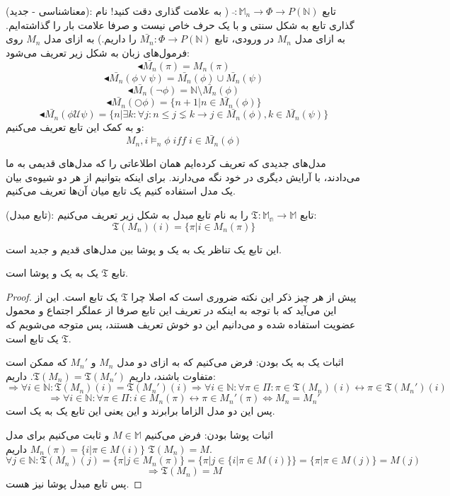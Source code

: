 \begin{defn}
	(معناشناسی - جدید): تابع 
	$\bar{ }:\mathbb{M}_n \rightarrow \Phi \rightarrow \mathit{P}(\mathbb{N})$
	( به علامت گذاری دقت کنید! نام گذاری تابع به شکل سنتی و با یک حرف خاص نیست و صرفا علامت بار را گذاشته‌ایم. به ازای مدل $M_n$ در ورودی، تابع 
	$\bar{M_n}: \Phi \rightarrow \mathit{P}(\mathbb{N})$
	را داریم.)
	به ازای مدل $M_n$ روی فرمول‌های زبان  به شکل زیر تعریف می‌شود:
	$$\blacktriangleleft \bar{M_n}(\pi)= M_n(\pi)$$
	$$\blacktriangleleft \bar{M_n}(\phi \lor \psi)= \bar{M_n}(\phi) \cup \bar{M_n}(\psi)$$
	$$\blacktriangleleft \bar{M_n}(\neg \phi)= \mathbb{N} \setminus \bar{M_n}(\phi)$$
	$$\blacktriangleleft \bar{M_n}(\bigcirc\phi)= \{n+1|n\in \bar{M_n}(\phi) \}$$
	$$\blacktriangleleft \bar{M_n}(\phi \mathcal{U} \psi)= \{n|\exists k : \forall j: n \leq j \lneq k \rightarrow j \in \bar{M_n}(\phi) , k \in \bar{M_n}(\psi) \}$$
	و به کمک این تابع تعریف می‌کنیم:
	$$M_n,i \models_n \phi \; \mathit{iff}\; i \in \bar{M_n}(\phi)$$
\end{defn}

مدل‌های جدیدی که تعریف کرده‌ایم همان اطلاعاتی را که مدل‌های قدیمی به ما می‌دادند، با آرایش دیگری در خود نگه می‌دارند. برای اینکه بتوانیم از هر دو شیوه‌ی بیان یک مدل استفاده کنیم یک تابع میان آن‌ها تعریف می‌کنیم.

\begin{defn}
	(تابع مبدل): تابع
	$\mathfrak{T}:\mathbb{M_n} \rightarrow \mathbb{M}$
	را به نام تابع مبدل به شکل زیر تعریف می‌کنیم:
	$$\mathfrak{T}(M_n)(i)=\{ \pi | i \in M_n(\pi) \}$$
\end{defn} 

این تابع یک تناظر یک به یک و پوشا بین مدل‌های قدیم و جدید است. 
\begin{thm}
	تابع $\mathfrak{T}$ یک به یک و پوشا است.
\end{thm}
\begin{proof}
	پیش از هر چیز ذکر این نکته ضروری است که اصلا چرا $\mathfrak{T}$ یک تابع است. این از این می‌آید که با توجه به اینکه در تعریف این تابع صرفا از عملگر اجتماع و محمول عضویت استفاده شده و می‌دانیم این دو خوش تعریف هستند، پس متوجه می‌شویم که $\mathfrak{T}$ یک تابع است.
	
	اثبات یک به یک بودن:
	فرض می‌‌کنیم که به ازای دو مدل $M_n$ و $M_n'$ که ممکن است متفاوت باشند، داریم $\mathfrak{T}(M_n)=\mathfrak{T}(M_n')$. داریم:
	$$\Rightarrow \forall i \in \mathbb{N}: \mathfrak{T}(M_n)(i)=\mathfrak{T}(M_n')(i)
	\Rightarrow \forall i \in \mathbb{N}: \forall \pi \in \Pi: \pi \in \mathfrak{T}(M_n)(i) \leftrightarrow \pi \in \mathfrak{T}(M_n')(i)$$
	$$\Rightarrow \forall i \in \mathbb{N}: \forall \pi \in \Pi: i \in M_n(\pi) \leftrightarrow \pi \in M_n'(\pi) \iff M_n = M_n'$$
	پس این دو مدل الزاما برابرند و این یعنی این تابع یک به یک است.
	
	اثبات پوشا بودن: فرض می‌کنیم $M \in \mathbb{M}$ و ثابت می‌کنیم برای مدل \break
	$M_n (\pi)=\{i | \pi \in M(i)\}$ 
	داریم $\mathfrak{T}(M_n)=M$.
	$$\forall j \in \mathbb{N}: \mathfrak{T}(M_n)(j)=\{\pi | j \in M_n(\pi)\}
	=\{\pi | j \in \{i | \pi \in M(i)\}\}= \{\pi | \pi \in M(j)\}=M(j)$$
	$$\Rightarrow \mathfrak{T}(M_n)=M$$
	پس تابع مبدل پوشا نیز هست.
\end{proof}

